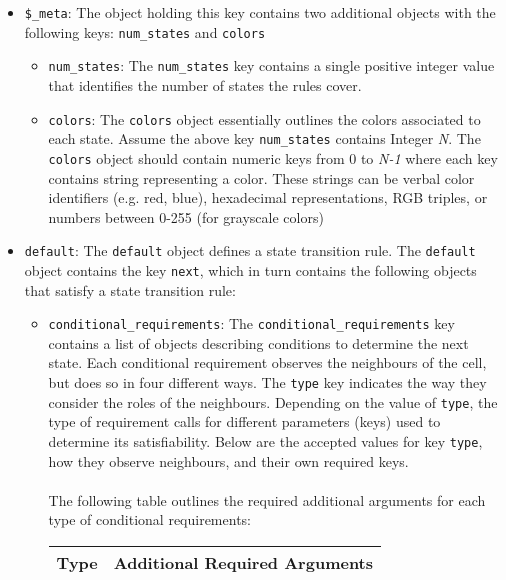 \begin{itemize}
    \item \texttt{\$\_meta}: 
    The object holding this key contains two additional objects with the following keys: \texttt{num\_states} and \texttt{colors}
    \begin{itemize}
        \item \texttt{num\_states}: The \texttt{num\_states} key contains a single positive integer value that identifies the number of states the rules cover.
        \item \texttt{colors}: The \texttt{colors} object essentially outlines the colors associated to each state. Assume the above key \texttt{num\_states} contains Integer \textit{N}. The \texttt{colors} object should contain numeric keys from 0 to \textit{N-1} where each key contains string representing a color. These strings can be verbal color identifiers (e.g. red, blue), hexadecimal representations, RGB triples, or numbers between 0-255 (for grayscale colors)
    \end{itemize}
    \item \texttt{default}: The \texttt{default} object defines a state transition rule. The \texttt{default} object contains the key \texttt{next}, which in turn contains the following objects that satisfy a state transition rule:
    \begin{itemize}
        \item \texttt{conditional\_requirements}: The \texttt{conditional\_requirements} key contains a list of objects describing conditions to determine the next state. Each conditional requirement observes the neighbours of the cell, but does so in four different ways. The \texttt{type} key indicates the way they consider the roles of the neighbours. Depending on the value of \texttt{type}, the type of requirement calls for different parameters (keys) used to determine its satisfiability.
        Below are the accepted values for key \texttt{type}, how they observe neighbours, and their own required keys. 
        \\ \\
        The following table outlines the required additional arguments for each type of conditional requirements:
        \begin{table}[]
\begin{tabular}{|l|l|}
\hline
\multicolumn{1}{|c|}{\textbf{Type}} & \multicolumn{1}{c|}{\textbf{Additional Required Arguments}}                                                                                                                                   \\ \hline

\end{tabular}
\end{table}
\end{itemize}
\end{itemize}
